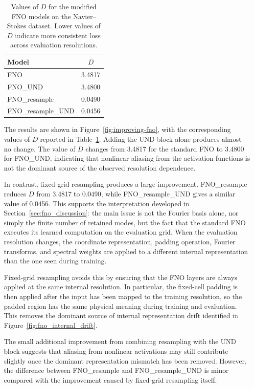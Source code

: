 \begin{table}
    \centering
    \caption{\label{tab:d-values-navier-stokes-improved-fno} Values of \(D\) for the modified FNO models on the Navier--Stokes dataset. Lower values of \(D\) indicate more consistent loss across evaluation resolutions.}
    \begin{tabular}{lc}
        \hline
        Model & \(D\) \\
        \hline
        FNO & 3.4817 \\
        FNO\_UND & 3.4800 \\
        FNO\_resample & 0.0490 \\
        FNO\_resample\_UND & 0.0456 \\
        \hline
    \end{tabular}
\end{table}

The results are shown in Figure~\ref{fig:improving-fno}, with the corresponding values of \(D\) reported in Table~\ref{tab:d-values-navier-stokes-improved-fno}. Adding the UND block alone produces almost no change. The value of \(D\) changes from 3.4817 for the standard FNO to 3.4800 for FNO\_UND, indicating that nonlinear aliasing from the activation functions is not the dominant source of the observed resolution dependence.

In contrast, fixed-grid resampling produces a large improvement. FNO\_resample reduces \(D\) from 3.4817 to 0.0490, while FNO\_resample\_UND gives a similar value of 0.0456. This supports the interpretation developed in Section~\ref{sec:fno_discussion}: the main issue is not the Fourier basis alone, nor simply the finite number of retained modes, but the fact that the standard FNO executes its learned computation on the evaluation grid. When the evaluation resolution changes, the coordinate representation, padding operation, Fourier transforms, and spectral weights are applied to a different internal representation than the one seen during training.

Fixed-grid resampling avoids this by ensuring that the FNO layers are always applied at the same internal resolution. In particular, the fixed-cell padding is then applied after the input has been mapped to the training resolution, so the padded region has the same physical meaning during training and evaluation. This removes the dominant source of internal representation drift identified in Figure~\ref{fig:fno_internal_drift}.

The small additional improvement from combining resampling with the UND block suggests that aliasing from nonlinear activations may still contribute slightly once the dominant representation mismatch has been removed. However, the difference between FNO\_resample and FNO\_resample\_UND is minor compared with the improvement caused by fixed-grid resampling itself.

